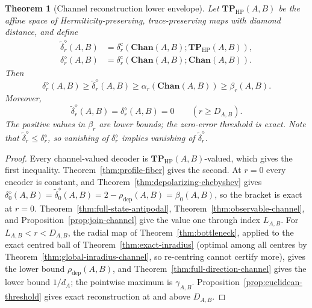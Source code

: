 \documentclass[11pt,a4paper]{article}
\theoremstyle{definition}
\theoremstyle{plain}
\newtheorem{theorem}{Theorem}[section]
\theoremstyle{remark}
\newcommand{\Chan}{\mathbf{Chan}}
\newcommand{\TPHP}{\mathbf{TP}_{\mathrm{HP}}}
\newcommand{\rhodep}{\rho_{\mathrm{dep}}}
\begin{document}
\begin{theorem}[Channel reconstruction lower envelope]
\label{thm:hierarchy}
Let $\TPHP(A,B)$ be the affine space of Hermiticity-preserving,
trace-preserving maps with diamond distance, and define
\begin{align*}
\widetilde\delta_r^\diamond(A,B)
&=\delta_r^{\mathrm c}(\Chan(A,B);\TPHP(A,B)),\\
\delta_r^\diamond(A,B)
&=\delta_r^{\mathrm c}(\Chan(A,B);\Chan(A,B)).
\end{align*}
Then
\[
\delta_r^\diamond(A,B)
\geq\widetilde\delta_r^\diamond(A,B)
\geq\alpha_r(\Chan(A,B))
\geq\beta_r(A,B).
\]
Moreover,
\[
\widetilde\delta_r^\diamond(A,B)=\delta_r^\diamond(A,B)=0
\qquad(r\geq D_{A,B}).
\]
The positive values in $\beta_r$ are lower bounds; the zero-error threshold
is exact. Note that $\widetilde\delta_r^\diamond\le\delta_r^\diamond$, so vanishing of $\delta_r^\diamond$ implies vanishing of $\widetilde\delta_r^\diamond$.
\end{theorem}

\begin{proof}
Every channel-valued decoder is $\TPHP(A,B)$-valued, which gives the first
inequality. Theorem~\ref{thm:profile-fiber} gives the second. At $r=0$ every encoder is constant, and
Theorem~\ref{thm:depolarizing-chebyshev} gives
$\delta_0^\diamond(A,B)=\widetilde\delta_0^\diamond(A,B)=2-\rhodep(A,B)=\beta_0(A,B)$,
so the bracket is exact at $r=0$.
Theorem~\ref{thm:full-state-antipodal}, Theorem~\ref{thm:observable-channel}, and
Proposition~\ref{prop:join-channel} give the value one through index
$L_{A,B}$. For $L_{A,B}<r<D_{A,B}$, the radial map of
Theorem~\ref{thm:bottleneck}, applied to the exact centred ball of
Theorem~\ref{thm:exact-inradius} (optimal among all centres by
Theorem~\ref{thm:global-inradius-channel}, so re-centring cannot certify
more), gives the lower bound $\rhodep(A,B)$, and Theorem~\ref{thm:full-direction-channel} gives the
lower bound $1/d_A$; the pointwise maximum is $\gamma_{A,B}$.
Proposition~\ref{prop:euclidean-threshold} gives
exact reconstruction at and above $D_{A,B}$.
\end{proof}
\end{document}
